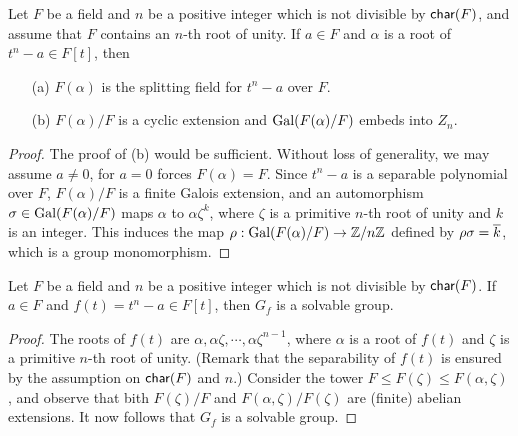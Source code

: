 \begin{prop}\label{radical -> cyclic}
    Let $F$ be a field and $n$ be a positive integer which is not divisible by ${\textsf{char}({F})}$, and assume that $F$ contains an $n$-th root of unity.
    If $a\in F$ and $\alpha$ is a root of $t^n-a\in F[t]$, then
    \begin{enumerate}
        \item[(a)]
        {
            $F(\alpha)$ is the splitting field for $t^n-a$ over $F$.
        }
        \item[(b)]
        {
            $F(\alpha)/F$ is a cyclic extension and ${\textrm{Gal}({F(\alpha)/F})}$ embeds into $Z_n$.
        }
    \end{enumerate}
\end{prop}
\begin{proof}
    The proof of (b) would be sufficient.
    Without loss of generality, we may assume $a\neq 0$, for $a=0$ forces $F(\alpha)=F$.
    Since $t^n-a$ is a separable polynomial over $F$, $F(\alpha)/F$ is a finite Galois extension, and an automorphism $\sigma\in{\textrm{Gal}({F(\alpha)/F})}$ maps $\alpha$ to $\alpha\zeta^k$, where $\zeta$ is a primitive $n$-th root of unity and $k$ is an integer.
    This induces the map $\rho: {\textrm{Gal}({F(\alpha)/F})}\rightarrow {\mathbb{Z}}/n{\mathbb{Z}}$ defined by $\rho\sigma=\overline{k}$, which is a group monomorphism.
\end{proof}
\begin{cor}
    Let $F$ be a field and $n$ be a positive integer which is not divisible by ${\textsf{char}({F})}$.
    If $a\in F$ and $f(t)=t^n-a\in F[t]$, then $G_f$ is a solvable group.
\end{cor}
\begin{proof}
    The roots of $f(t)$ are $\alpha, \alpha\zeta, \cdots, \alpha\zeta^{n-1}$, where $\alpha$ is a root of $f(t)$ and $\zeta$ is a primitive $n$-th root of unity. (Remark that the separability of $f(t)$ is ensured by the assumption on ${\textsf{char}({F})}$ and $n$.)
    Consider the tower $F\leq F(\zeta)\leq F(\alpha, \zeta)$, and observe that bith $F(\zeta)/F$ and $F(\alpha, \zeta)/F(\zeta)$ are (finite) abelian extensions.
    It now follows that $G_f$ is a solvable group.
\end{proof}

